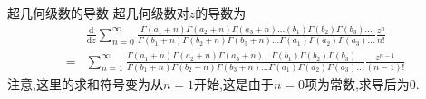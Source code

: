 \documentclass[zihao=-4,a4paper]{ctexart}
\begin{document}
\begin{mtheorem}{超几何级数的导数}
	超几何级数对$z$的导数为
	\begin{equation*}
		\begin{split}
			&\frac{ \text{d} }{ \text{d} {z} } \sum^{\infty}_{n=0} \frac{ {\Gamma} { \left( {a}_{1} + {n} \right) } {\Gamma} { \left( {a}_{2} + {n} \right) } {\Gamma} { \left( {a}_{3} + {n} \right) } ... { \left( {b}_{1} \right) } {\Gamma} { { \left( {b}_{2} \right) } } {\Gamma} { { \left( {b}_{3} \right) } } ... } { {\Gamma} { \left( {b}_{1} + {n} \right) } {\Gamma} { \left( {b}_{2} + {n} \right) } {\Gamma} { \left( {b}_{3} + {n} \right) } ... {\Gamma} { \left( {a}_{1} \right) } {\Gamma} { { \left( {a}_{2} \right) } } {\Gamma} { { \left( {a}_{3} \right) } } ... } \frac{ {z}^{n} }{ {n} ! }\\
			=&\sum^{\infty}_{n=1} \frac{ {\Gamma} { \left( {a}_{1} + {n} \right) } {\Gamma} { \left( {a}_{2} + {n} \right) } {\Gamma} { \left( {a}_{3} + {n} \right) } ... {\Gamma} { \left( {b}_{1} \right) } {\Gamma} { { \left( {b}_{2} \right) } } {\Gamma} { { \left( {b}_{3} \right) } } ... } { {\Gamma} { \left( {b}_{1} + {n} \right) } {\Gamma} { \left( {b}_{2} + {n} \right) } {\Gamma} { \left( {b}_{3} + {n} \right) } ... {\Gamma} { \left( {a}_{1} \right) } {\Gamma} { { \left( {a}_{2} \right) } } {\Gamma} { { \left( {a}_{3} \right) } } ... } \frac{ {z}^{n-1} }{ \left( {n} - {1} \right) ! }
		\end{split}
	\end{equation*}
	注意,这里的求和符号变为从$n=1$开始,这是由于$n=0$项为常数,求导后为$0$.


\end{mtheorem}
\end{document}
